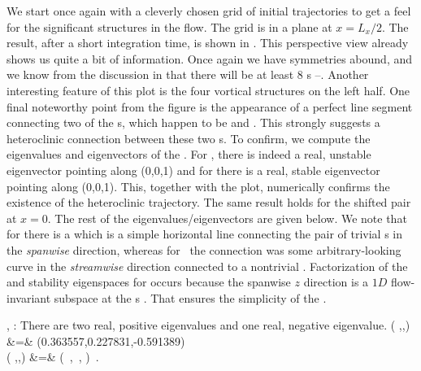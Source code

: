 \documentclass[lineno]{jfm}
\begin{document}
We start once again with a cleverly chosen grid of initial trajectories 
to get a feel for the significant structures in the flow. The grid is in 
a plane at $x = L_{x}/2$. The result, after a short integration time, is 
shown in . This perspective view already shows 
us quite a bit of information. Once again we have symmetries abound, and 
we know from the discussion in  that there will be 
at least 8 {\stagp}s --.  Another interesting feature of this 
plot is the four vortical structures on the left half. One final 
noteworthy point from the figure is the appearance of a perfect line 
segment connecting two of the {\stagp}s, which happen to be  and 
. This strongly suggests a heteroclinic connection between these 
two \stagp s. To confirm, we compute the eigenvalues and eigenvectors of 
the \velgradmat. For , there is indeed a real, unstable eigenvector 
pointing along (0,0,1) and for  there is a real, stable eigenvector 
pointing along (0,0,1). This, together with the plot, numerically 
confirms the existence of the heteroclinic trajectory. The same result  
holds for the shifted pair at $x = 0$. The rest of the 
eigenvalues/eigenvectors are given below. We note that for {\tEQeight} there 
is a {\hc} which is a simple horizontal line connecting the pair of 
trivial \stagp s in the \emph{spanwise} direction, whereas for \tEQtwo\ 
the connection was some arbitrary-looking curve in the 
\emph{streamwise} direction connected to a nontrivial \stagp. 
Factorization of the  and  stability eigenspaces for {\tEQeight} 
occurs because the spanwise $z$ direction is a $1D$ flow-invariant 
subspace at the \stagp s \citep{SiCvi10}. That ensures the simplicity of 
the \hec. 

{\tEQeight}, : There are two real, positive eigenvalues
 and one real, negative eigenvalue.
\bea
\left(
    \eigExp[1],\eigExp[2],\eigExp[3]
\right) &=&
      (0.363557,0.227831,-0.591389)
\label{E8SP1} \\
\left(
    \jEigvec[1],\jEigvec[2],\jEigvec[3]
\right) &=&
\left(
    \left[\begin{array}{c}
             {0} \cr
             {0} \cr
             {1}
 \end{array}\right] \,,
    \left[\begin{array}{c}
             {-0.733415} \cr
             {-0.679780} \cr
             {0}
 \end{array}\right] \,,
    \left[\begin{array}{c}
             {0.991005} \cr
             {0.133824} \cr
             {0}
 \end{array}\right]
\right) \,.
\nnu
\eea
\end{document}
